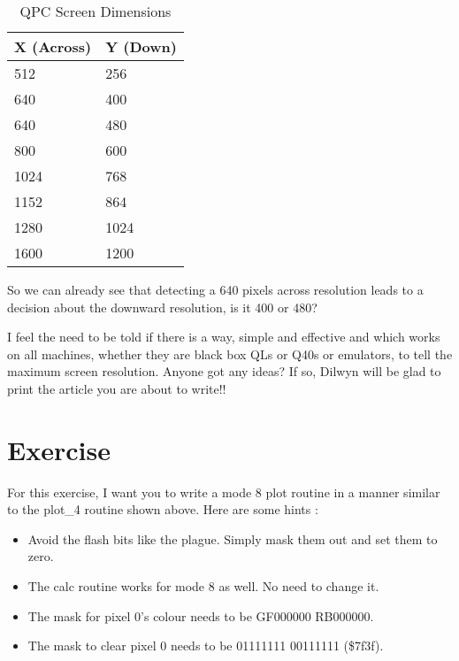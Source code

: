 \begin{table}[htbp]
\centering
\begin{tabular}{l l}
\toprule
\textbf{X (Across)} & \textbf{Y (Down)} \\
\midrule
%
512 & 256 \\
640 & 400 \\
640 & 480 \\
800 & 600 \\
1024 & 768 \\
1152 & 864 \\
1280 & 1024 \\
1600 & 1200 \\
%
\bottomrule
\end{tabular}
\caption{QPC Screen Dimensions}
\label{tab:QPCScreenDimensions}
\end{table}

So we can already see that detecting a 640 pixels across resolution
    leads to a decision about the downward resolution, is it 400 or
    480?

I feel the need to be told if there is a way, simple and effective
    and which works on all machines, whether they are black box QLs or Q40s or
    emulators, to tell the maximum screen resolution. Anyone got any ideas? If
    so, Dilwyn will be glad to print the article you are about to write!!

\section{Exercise}
\label{ch8-exercise}%

For this exercise, I want you to write a mode 8 plot routine in a
    manner similar to the plot\_4 routine shown above. Here are some hints
   :
\begin{itemize}[itemsep=0pt]

\item{}Avoid the flash bits like the plague. Simply mask them out and
        set them to zero.


\item{}The calc routine works for mode 8 as well. No need to change
        it.


\item{}The mask for pixel 0's colour needs to be GF000000
        RB000000.


\item{}The mask to clear pixel 0 needs to be 01111111 00111111
        (\$7f3f).

\end{itemize}

